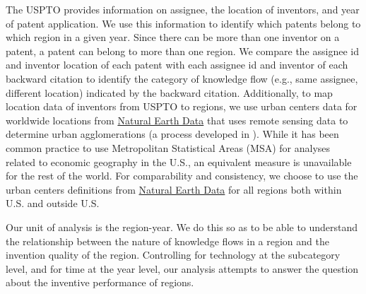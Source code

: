 \documentclass[12pt,letterpaper]{article}
\begin{document}
The USPTO provides information on assignee, the location of inventors, and year of patent application. We use this information to identify which patents belong to which region in a given year. Since there can be more than one inventor on a patent, a patent can belong to more than one region. We compare the assignee id and inventor location of each patent with each assignee id and inventor of each backward citation  to identify the category of knowledge flow (e.g., same assignee, different location) indicated by the backward citation. Additionally, to map location data of inventors from USPTO to regions, we use urban centers data for worldwide locations from \href{http://www.naturalearthdata.com/downloads/10m-cultural-vectors/}{Natural Earth Data} that uses remote sensing data to determine urban agglomerations (a process developed in \citet*{Schneider2003}).  While it has been common practice to use Metropolitan Statistical Areas (MSA) for analyses related to economic geography in the U.S., an equivalent measure is unavailable for the rest of the world. For comparability and consistency, we choose to use the urban centers definitions from \href{http://www.naturalearthdata.com/downloads/10m-cultural-vectors/}{Natural Earth Data} for all regions both within U.S. and outside U.S. \par


Our unit of analysis is the region-year. We do this so as to be able to understand the relationship between the nature of knowledge flows in a region and the invention quality of the region. Controlling for technology at the subcategory level, and for time at the year level, our analysis attempts to answer the question about the inventive performance of regions.\par
\end{document}
